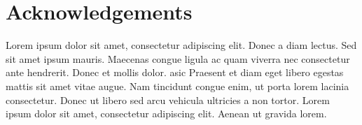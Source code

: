\documentclass[12pt]{article}
\begin{document}
\section*{Acknowledgements}
Lorem ipsum dolor sit amet, consectetur adipiscing elit. Donec a diam lectus. Sed sit amet ipsum mauris. Maecenas congue ligula ac quam viverra nec consectetur ante hendrerit. Donec et mollis dolor. \gls{asic} Praesent et diam eget libero egestas mattis sit amet vitae augue. Nam tincidunt congue enim, ut porta lorem lacinia consectetur. Donec ut libero sed arcu vehicula ultricies a non tortor. Lorem ipsum dolor sit amet, consectetur adipiscing elit. Aenean ut gravida lorem.


\printglossaries

%
%
%
%
%
\end{document}
